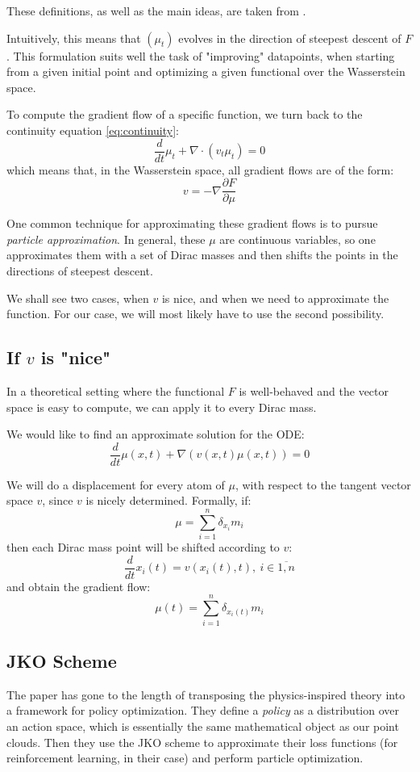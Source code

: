 \documentclass{article}
\begin{document}
These definitions, as well as the main ideas, are taken from \cite{craig2017gradient}.

Intuitively, this means that $(\mu_t)$ evolves in the direction of steepest 
descent of $F$. This formulation suits well the task of "improving" datapoints,
when starting from a given initial point and optimizing a given functional
over the Wasserstein space.

To compute the gradient flow of a specific function, we turn back to the 
continuity equation \ref{eq:continuity}:
\[\frac{d}{dt}\mu_t + \nabla \cdot (v_t\mu_t) = 0\]
which means that, in the Wasserstein space, all gradient flows are of the form:
\[v = -\nabla\frac{\partial F}{\partial \mu} \]

One common technique for approximating these gradient flows is to pursue 
\textit{particle approximation}. In general, these $\mu$ are continuous
variables, so one approximates them with a set of Dirac masses and then 
shifts the points in the directions of steepest descent.

We shall see two cases, when $v$ is nice, and when we need to approximate 
the function. For our case, we will most likely have to use the second
possibility.

\subsection{If $v$ is "nice"}

In a theoretical setting where the functional $F$ is well-behaved and the 
vector space is easy to compute, we can apply it to every Dirac mass.

We would like to find an approximate solution for the ODE:
\[\frac{d}{dt}\mu(x,t) + \nabla (v(x,t)\mu(x,t)) = 0 \]

We will do a displacement for every atom of $\mu$, with respect to the 
tangent vector space $v$, since $v$ is nicely determined. Formally, if:
\[\mu = \sum_{i=1}^n\delta_{x_i}m_i \] 
then each Dirac mass point will be shifted according to $v$:
\[\frac{d}{dt}x_i(t) = v(x_i(t), t),\ i\in\overline{1,n}\]
and obtain the gradient flow:
\[\mu(t) = \sum_{i=1}^n\delta_{x_i(t)}m_i \]

\subsection{JKO Scheme}

The paper \cite{zhang2018policy} has gone to the length of transposing the 
physics-inspired theory into a framework for policy optimization. They define 
a \textit{policy} as a distribution over an action space, which is essentially 
the same mathematical object as our point clouds. Then they use the JKO 
scheme to approximate their loss functions (for reinforcement learning, 
in their case) and perform particle optimization.
\end{document}
